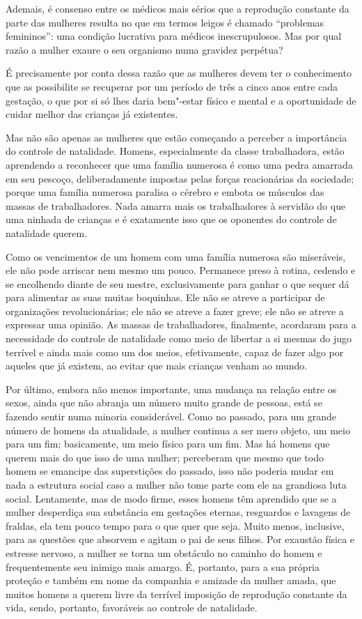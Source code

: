 Ademais, é consenso entre os médicos mais sérios que a reprodução\label{saude}
constante da parte das mulheres resulta no que em termos leigos é
chamado ``problemas femininos'': uma condição lucrativa para médicos
inescrupulosos. Mas por qual razão a mulher exaure o seu organismo numa
gravidez perpétua?

É precisamente por conta dessa razão que as mulheres devem ter o
conhecimento que as possibilite se recuperar por um período de três a
cinco anos entre cada gestação, o que por si só lhes daria bem"-estar
físico e mental e a oportunidade de cuidar melhor das crianças já
existentes.

Mas não são apenas as mulheres que estão começando a perceber a
importância do controle de natalidade. Homens, especialmente da classe
trabalhadora, estão aprendendo a reconhecer que uma família numerosa é
como uma pedra amarrada em seu pescoço, deliberadamente impostas
pelas forças reacionárias da sociedade; porque uma família numerosa
paralisa o cérebro e embota os músculos das massas de trabalhadores.
Nada amarra mais os trabalhadores à servidão do que uma ninhada de
crianças e é exatamente isso que os oponentes do controle de natalidade
querem.

Como os vencimentos de um homem com uma família numerosa são miseráveis,
ele não pode arriscar nem mesmo um pouco. Permanece preso à
rotina, cedendo e se encolhendo diante de seu mestre, exclusivamente para
ganhar o que sequer dá para alimentar as suas muitas boquinhas. Ele não se
atreve a participar de organizações revolucionárias; ele não se atreve a
fazer greve; ele não se atreve a expressar uma opinião. As massas de
trabalhadores, finalmente, acordaram para a necessidade do controle de
natalidade como meio de libertar a si mesmas do jugo terrível e ainda
mais como um dos meios, efetivamente, capaz de fazer algo por aqueles que já existem, ao evitar que mais crianças venham ao mundo.

Por último, embora não menos importante, uma mudança na relação entre os
sexos, ainda que não abranja um número muito grande de pessoas, está se
fazendo sentir numa minoria considerável. Como no passado, para um
grande número de homens da atualidade, a mulher continua a ser mero
objeto, um meio para um fim; basicamente, um meio físico para um fim.
Mas há homens que querem mais do que isso de uma mulher; perceberam que
mesmo que todo homem se emancipe das superstições do passado, isso não
poderia mudar em nada a estrutura social caso a mulher não tome parte
com ele na grandiosa luta social. Lentamente, mas de modo firme, esses
homens têm aprendido que se a mulher desperdiça sua substância em
gestações eternas, resguardos e lavagens de fraldas, ela tem pouco tempo
para o que quer que seja. Muito menos, inclusive, para as questões que
absorvem e agitam o pai de seus filhos. Por exaustão física e estresse
nervoso, a mulher se torna um obstáculo no caminho do homem e
frequentemente seu inimigo mais amargo. É, portanto, para a sua própria
proteção e também em nome da companhia e amizade da mulher amada, que
muitos homens a querem livre da terrível imposição de reprodução
constante da vida, sendo, portanto, favoráveis ao controle de
natalidade.

